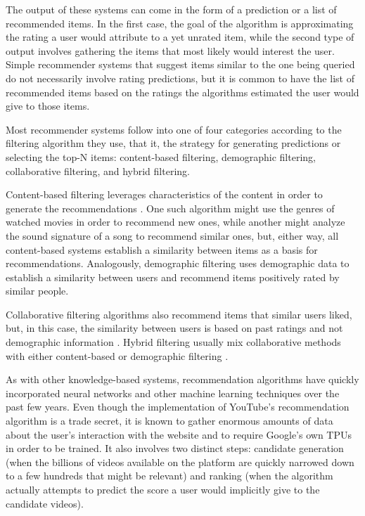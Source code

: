 The output of these systems can come in the form of a prediction or a list of
recommended items. In the first case, the goal of the algorithm is approximating
the rating a user would attribute to a yet unrated item, while the second type
of output involves gathering the items that most likely would interest the user.
Simple recommender systems that suggest items similar to the one being queried
do not necessarily involve rating predictions, but it is common to have the list
of recommended items based on the ratings the algorithms estimated the user would
give to those items.

Most recommender systems follow into one of four categories according to the
filtering algorithm they use, that it, the strategy for generating predictions
or selecting the top-N items: content-based filtering, demographic filtering,
collaborative filtering, and hybrid filtering.

Content-based filtering leverages characteristics of the content in order to
generate the recommendations \citep{ricci_introduction_2011}. One such algorithm
might use the genres of watched movies in order to recommend new ones, while
another might analyze the sound signature of a song to recommend similar ones,
but, either way, all content-based systems establish a similarity between items
as a basis for recommendations. Analogously, demographic filtering uses
demographic data to establish a similarity between users and recommend items
positively rated by similar people.

Collaborative filtering algorithms also recommend items that similar users
liked, but, in this case, the similarity between users is based on past ratings
and not demographic information \citep{ricci_introduction_2011}. Hybrid
filtering usually mix collaborative methods with either content-based or
demographic filtering \citep{ricci_introduction_2011}.

As with other knowledge-based systems, recommendation algorithms have quickly
incorporated neural networks and other machine learning techniques over the past
few years. Even though the implementation of YouTube's recommendation algorithm
is a trade secret, it is known to gather enormous amounts of data about the
user's interaction with the website and to require Google's own TPUs in order to
be trained. It also involves two distinct steps: candidate generation (when the
billions of videos available on the platform are quickly narrowed down to a few
hundreds that might be relevant) and ranking (when the algorithm actually
attempts to predict the score a user would implicitly give to the candidate
videos).

